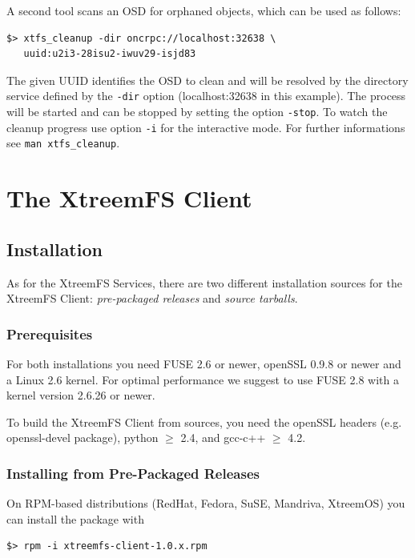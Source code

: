 \documentclass[a4paper,10pt]{book}
\begin{document}
A second tool scans an OSD for orphaned objects, which can be used as follows:

\begin{verbatim}
$> xtfs_cleanup -dir oncrpc://localhost:32638 \
   uuid:u2i3-28isu2-iwuv29-isjd83
\end{verbatim}
The given UUID identifies the OSD to clean and will be resolved by the
directory service defined by the \texttt{-dir} option (localhost:32638 in this example).
The process will be started and can be stopped by setting the option
\texttt{-stop}. To watch the cleanup progress use option \texttt{-i} for the
interactive mode. For further informations see \texttt{man xtfs\_cleanup}.


\chapter{The XtreemFS Client}

\section{Installation}

As for the XtreemFS Services, there are two different installation sources for the XtreemFS Client: \emph{pre-packaged releases} and \emph{source tarballs}.

\subsection{Prerequisites}

For both installations you need FUSE 2.6 or newer, openSSL 0.9.8 or newer and a Linux 2.6 kernel. For optimal performance we suggest to use FUSE 2.8 with a kernel version 2.6.26 or newer.

To build the XtreemFS Client from sources, you need the openSSL headers (e.g. openssl-devel package), python $\geq$ 2.4, and gcc-c++ $\geq$ 4.2.

\subsection{Installing from Pre-Packaged Releases}

On RPM-based distributions (RedHat, Fedora, SuSE, Mandriva, XtreemOS) you can install the package with


\begin{verbatim}
$> rpm -i xtreemfs-client-1.0.x.rpm
\end{verbatim}
\end{document}
